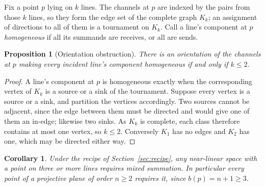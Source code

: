 \documentclass[11pt]{article}
\theoremstyle{plain}
\newtheorem{proposition}[theorem]{Proposition}
\newtheorem{corollary}[theorem]{Corollary}
\theoremstyle{definition}
\theoremstyle{remark}
\begin{document}
Fix a point $p$ lying on $k$ lines. The channels at $p$ are indexed by the pairs from those
$k$ lines, so they form the edge set of the complete graph $K_k$; an assignment of
directions to all of them is a tournament on $K_k$. Call a line's component at $p$
\emph{homogeneous} if all its summands are receives, or all are sends.

\begin{proposition}[Orientation obstruction]
\label{prop:tournament}
There is an orientation of the channels at $p$ making every incident line's component
homogeneous if and only if $k \leq 2$.
\end{proposition}

\begin{proof}
A line's component at $p$ is homogeneous exactly when the corresponding vertex of $K_k$ is
a source or a sink of the tournament. Suppose every vertex is a source or a sink, and
partition the vertices accordingly. Two sources cannot be adjacent, since the edge between
them must be directed and would give one of them an in-edge; likewise two sinks. As $K_k$
is complete, each class therefore contains at most one vertex, so $k \leq 2$. Conversely
$K_1$ has no edges and $K_2$ has one, which may be directed either way.
\end{proof}

\begin{corollary}
\label{cor:mixed}
Under the recipe of Section~\ref{sec:recipe}, any near-linear space with a point on three
or more lines requires mixed summation. In particular every point of a projective plane of
order $n \geq 2$ requires it, since $b(p) = n+1 \geq 3$.
\end{corollary}
\end{document}
